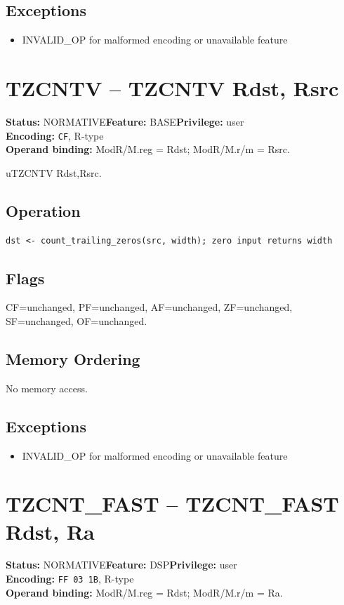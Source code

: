 \documentclass[10pt]{article}
\begin{document}
\subsection*{Exceptions}
\begin{itemize}
\item INVALID\_OP for malformed encoding or unavailable feature
\end{itemize}
\clearpage

\section{TZCNTV -- TZCNTV Rdst, Rsrc}
\textbf{Status:} NORMATIVE\quad \textbf{Feature:} BASE\quad \textbf{Privilege:} user\\
\textbf{Encoding:} \texttt{CF}, R-type\\
\textbf{Operand binding:} ModR/M.reg = Rdst; ModR/M.r/m = Rsrc.

uTZCNTV Rdst,Rsrc.

\subsection*{Operation}
\begin{lstlisting}
dst <- count_trailing_zeros(src, width); zero input returns width
\end{lstlisting}
\subsection*{Flags}
CF=unchanged, PF=unchanged, AF=unchanged, ZF=unchanged, SF=unchanged, OF=unchanged.
\subsection*{Memory Ordering}
No memory access.
\subsection*{Exceptions}
\begin{itemize}
\item INVALID\_OP for malformed encoding or unavailable feature
\end{itemize}
\clearpage

\section{TZCNT\_FAST -- TZCNT\_FAST Rdst, Ra}
\textbf{Status:} NORMATIVE\quad \textbf{Feature:} DSP\quad \textbf{Privilege:} user\\
\textbf{Encoding:} \texttt{FF 03 1B}, R-type\\
\textbf{Operand binding:} ModR/M.reg = Rdst; ModR/M.r/m = Ra.
\end{document}
